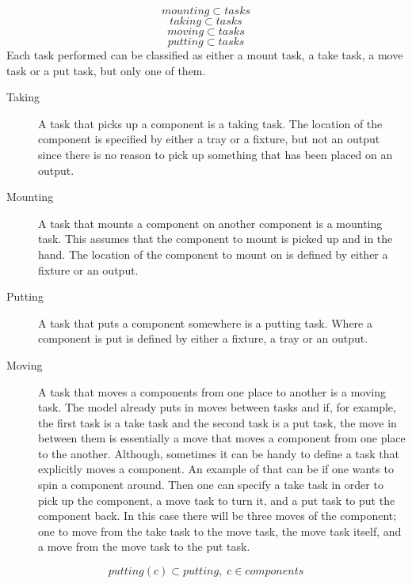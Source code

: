  \begin{equation}\label{eq:26}
 mounting \subset tasks
 \end{equation}
 \begin{equation}\label{eq:27}
 taking \subset tasks
 \end{equation}
 \begin{equation}\label{eq:28}
 moving \subset tasks
 \end{equation}
 \begin{equation}\label{eq:29}
 putting \subset tasks
 \end{equation}
 Each task performed can be classified as either a mount task, a take task, a move task or a put task, but only one of them.
 \begin{description}
 \item[Taking] A task that picks up a component is a taking task. The location of the component is specified by either a tray or a fixture, but not an output since there is no reason to pick up something that has been placed on an output.
 
 \item[Mounting] A task that mounts a component on another component is a mounting task. This assumes that the component to mount is picked up and in the hand. The location of the component to mount on is defined by either a fixture or an output.
 
 \item[Putting] A task that puts a component somewhere is a putting task. Where a component is put is defined by either a fixture, a tray or an output.
 
 \item[Moving] A task that moves a components from one place to another is a moving task. The model already puts in moves between tasks and if, for example, the first task is a take task and the second task is a put task, the move in between them is essentially a move that moves a component from one place to the another. Although, sometimes it can be handy to define a task that explicitly moves a component. An example of that can be if one wants to spin a component around. Then one can specify a take task in order to pick up the component, a move task to turn it, and a put task to put the component back. In this case there will be three moves of the component; one to move from the take task to the move task, the move task itself, and a move from the move task to the put task.
 \end{description}
 \begin{equation}\label{eq:35}
 putting(c) \subset putting, \; c \in components
 \end{equation}
